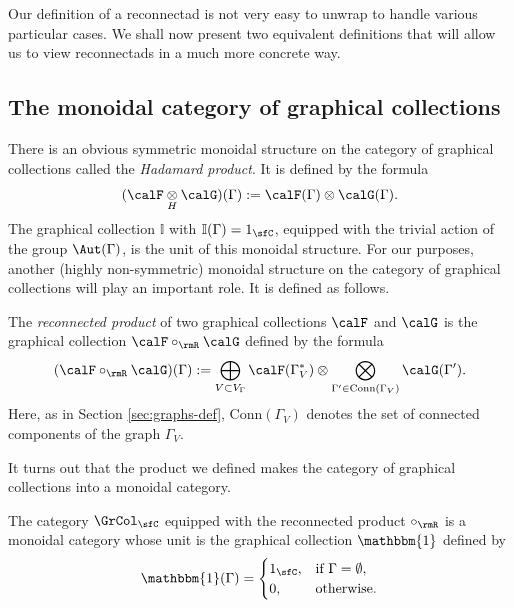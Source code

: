 Our definition of a reconnectad is not very easy to unwrap to handle various particular cases. We shall now present two equivalent definitions that will allow us to view reconnectads in a much more concrete way. 

\subsection{The monoidal category of graphical collections}

There is an obvious symmetric monoidal structure on the category of graphical collections called the \emph{Hadamard product}. It is defined by the formula 
 \[
(\calF\underset{H}{\otimes}\calG)(\Gamma):=\calF(\Gamma)\otimes\calG(\Gamma).
 \]
The graphical collection $\mathbb{I}$ with $\mathbb{I}(\Gamma)=1_{\sfC}$, equipped with the trivial action of the group $\Aut(\Gamma)$, is the unit of this monoidal structure. For our purposes, another (highly non-symmetric) monoidal structure on the category of graphical collections will play an important role. It is defined as follows.

\begin{defi}
The \emph{reconnected product} of two graphical collections $\calF$ and $\calG$ is the graphical collection $\calF\circ_{\rmR}\calG$ defined by the formula
 \[
(\calF\circ_{\rmR}\calG)(\Gamma):=\bigoplus_{V\subset V_\Gamma}\calF(\Gamma^*_V)\otimes\bigotimes_{\Gamma'\in\mathrm{Conn}(\Gamma_V)} \calG(\Gamma').
 \]
Here, as in Section \ref{sec:graphs-def}, $\mathrm{Conn}(\Gamma_V)$ denotes the set of connected components of the graph $\Gamma_V$. 
\end{defi}

It turns out that the product we defined makes the category of graphical collections into a monoidal category. 

\begin{prop}\label{prop:assoc}
The category $\GrCol_{\sfC}$ equipped with the reconnected product $\circ_{\rmR}$ is a monoidal category whose unit is the graphical collection $\mathbbm{1}$ defined by 
 \[
\mathbbm{1}(\Gamma)=
\begin{cases}
1_{\sfC}, & \text{if } \Gamma=\emptyset, \\
0, & \text{otherwise.}
\end{cases}
 \]
\end{prop}

